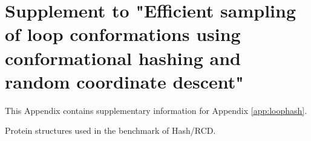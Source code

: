 \clearpage %

\chapter{Supplement to "Efficient sampling of loop conformations using conformational hashing and random coordinate descent"} \label{app:loophash_supp}

This Appendix contains supplementary information for Appendix \ref{app:loophash}.


\begin{wraptable}{R}{0.5\textwidth}
\scriptsize
\renewcommand{\tabcolsep}{0.09cm}
\centering
\caption[Protein structures used in the benchmark of Hash/RCD.]{Protein structures used in the benchmark of Hash/RCD.}

\label{tab:loophash_benchmark}
\end{wraptable}